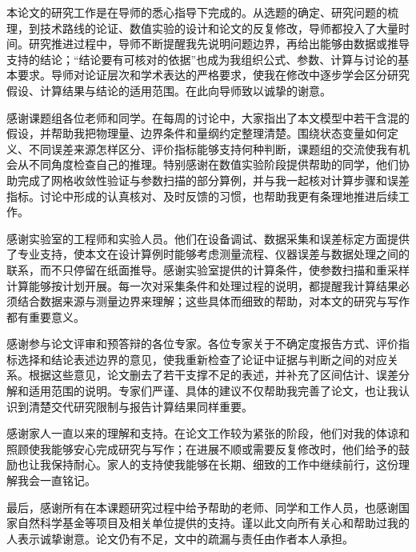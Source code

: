\begin{thanks}

本论文的研究工作是在导师的悉心指导下完成的。从选题的确定、研究问题的梳理，到技术路线的论证、数值实验的设计和论文的反复修改，导师都投入了大量时间。研究推进过程中，导师不断提醒我先说明问题边界，再给出能够由数据或推导支持的结论；“结论要有可核对的依据”也成为我组织公式、参数、计算与讨论的基本要求。导师对论证层次和学术表达的严格要求，使我在修改中逐步学会区分研究假设、计算结果与结论的适用范围。在此向导师致以诚挚的谢意。

感谢课题组各位老师和同学。在每周的讨论中，大家指出了本文模型中若干含混的假设，并帮助我把物理量、边界条件和量纲约定整理清楚。围绕状态变量如何定义、不同误差来源怎样区分、评价指标能够支持何种判断，课题组的交流使我有机会从不同角度检查自己的推理。特别感谢在数值实验阶段提供帮助的同学，他们协助完成了网格收敛性验证与参数扫描的部分算例，并与我一起核对计算步骤和误差指标。讨论中形成的认真核对、及时反馈的习惯，也帮助我更有条理地推进后续工作。

感谢实验室的工程师和实验人员。他们在设备调试、数据采集和误差标定方面提供了专业支持，使本文在设计算例时能够考虑测量流程、仪器误差与数据处理之间的联系，而不只停留在纸面推导。感谢实验室提供的计算条件，使参数扫描和重采样计算能够按计划开展。每一次对采集条件和处理过程的说明，都提醒我计算结果必须结合数据来源与测量边界来理解；这些具体而细致的帮助，对本文的研究与写作都有重要意义。

感谢参与论文评审和预答辩的各位专家。各位专家关于不确定度报告方式、评价指标选择和结论表述边界的意见，使我重新检查了论证中证据与判断之间的对应关系。根据这些意见，论文删去了若干支撑不足的表述，并补充了区间估计、误差分解和适用范围的说明。专家们严谨、具体的建议不仅帮助我完善了论文，也让我认识到清楚交代研究限制与报告计算结果同样重要。

感谢家人一直以来的理解和支持。在论文工作较为紧张的阶段，他们对我的体谅和照顾使我能够安心完成研究与写作；在进展不顺或需要反复修改时，他们给予的鼓励也让我保持耐心。家人的支持使我能够在长期、细致的工作中继续前行，这份理解我会一直铭记。

最后，感谢所有在本课题研究过程中给予帮助的老师、同学和工作人员，也感谢国家自然科学基金等项目及相关单位提供的支持。谨以此文向所有关心和帮助过我的人表示诚挚谢意。论文仍有不足，文中的疏漏与责任由作者本人承担。

\end{thanks}
